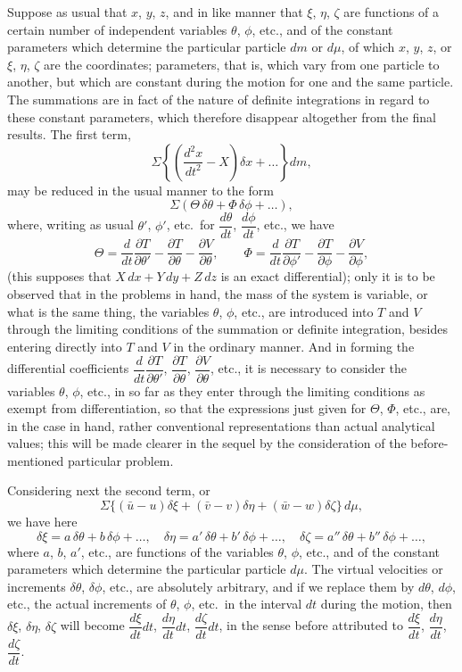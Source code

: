 \documentclass[11pt,a4paper]{book}
\theoremstyle{plain}
\begin{document}
Suppose as usual that $x$, $y$, $z$, and in like manner that $\xi$, $\eta$, $\zeta$ are functions of a certain number of independent variables $\theta$, $\phi$, etc., and of the constant parameters which determine the particular particle $dm$ or $d\mu$, of which $x$, $y$, $z$, or $\xi$, $\eta$, $\zeta$ are the coordinates; parameters, that is, which vary from one particle to another, but which are constant during the motion for one and the same particle. The summations are in fact of the nature of definite integrations in regard to these constant parameters, which therefore disappear altogether from the final results. The first term,
\[
\Sigma\left\{\left(\frac{d^2x}{dt^2}-X\right)\delta x+\ldots\right\}dm,
\]
may be reduced in the usual manner to the form
\[
\Sigma(\Theta\,\delta\theta+\Phi\,\delta\phi+\ldots),
\]
where, writing as usual $\theta'$, $\phi'$, etc.\ for $\dfrac{d\theta}{dt}$, $\dfrac{d\phi}{dt}$, etc., we have
\[
\Theta=\frac{d}{dt}\frac{\partial T}{\partial\theta'}-\frac{\partial T}{\partial\theta}-\frac{\partial V}{\partial\theta},
\qquad
\Phi=\frac{d}{dt}\frac{\partial T}{\partial\phi'}-\frac{\partial T}{\partial\phi}-\frac{\partial V}{\partial\phi},
\]
(this supposes that $X\,dx+Y\,dy+Z\,dz$ is an exact differential); only it is to be observed that in the problems in hand, the mass of the system is variable, or what is the same thing, the variables $\theta$, $\phi$, etc., are introduced into $T$ and $V$ through the limiting conditions of the summation or definite integration, besides entering directly into $T$ and $V$ in the ordinary manner. And in forming the differential coefficients $\dfrac{d}{dt}\dfrac{\partial T}{\partial\theta'}$, $\dfrac{\partial T}{\partial\theta}$, $\dfrac{\partial V}{\partial\theta}$, etc., it is necessary to consider the variables $\theta$, $\phi$, etc., in so far as they enter through the limiting conditions as exempt from differentiation, so that the expressions just given for $\Theta$, $\Phi$, etc., are, in the case in hand, rather conventional representations than actual analytical values; this will be made clearer in the sequel by the consideration of the before-mentioned particular problem.

Considering next the second term, or
\[
\Sigma\{(\bar{u}-u)\delta\xi+(\bar{v}-v)\delta\eta+(\bar{w}-w)\delta\zeta\}\,d\mu,
\]
we have here
\[
\delta\xi=a\,\delta\theta+b\,\delta\phi+\ldots,
\quad
\delta\eta=a'\,\delta\theta+b'\,\delta\phi+\ldots,
\quad
\delta\zeta=a''\,\delta\theta+b''\,\delta\phi+\ldots,
\]
where $a$, $b$, $a'$, etc., are functions of the variables $\theta$, $\phi$, etc., and of the constant parameters which determine the particular particle $d\mu$. The virtual velocities or increments $\delta\theta$, $\delta\phi$, etc., are absolutely arbitrary, and if we replace them by $d\theta$, $d\phi$, etc., the actual increments of $\theta$, $\phi$, etc.\ in the interval $dt$ during the motion, then $\delta\xi$, $\delta\eta$, $\delta\zeta$ will become $\dfrac{d\xi}{dt}dt$, $\dfrac{d\eta}{dt}dt$, $\dfrac{d\zeta}{dt}dt$, in the sense before attributed to $\dfrac{d\xi}{dt}$, $\dfrac{d\eta}{dt}$, $\dfrac{d\zeta}{dt}$.
\end{document}
